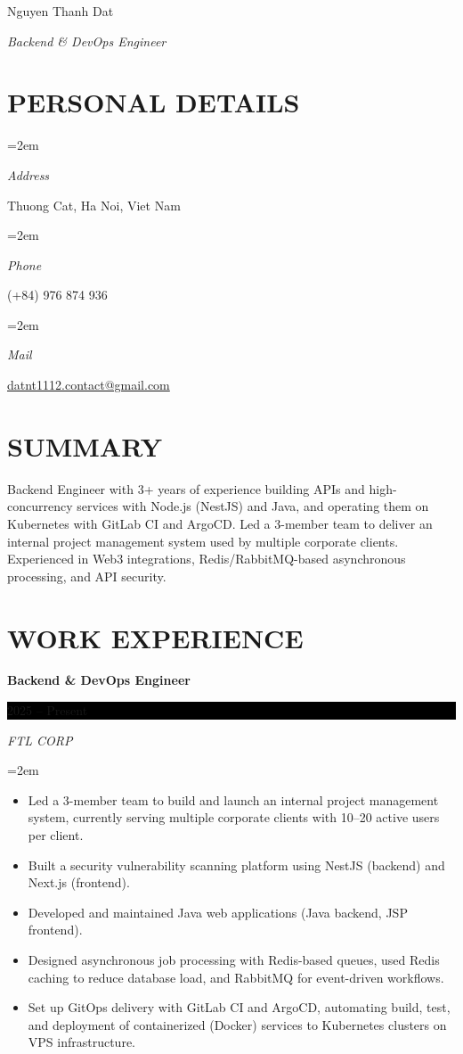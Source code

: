 \documentclass[paper=a4,fontsize=11pt]{scrartcl} %
\newlength{\spacebox}
\newcommand{\sepspace}{\vspace*{1em}}     %
\newcommand{\MyName}[1]{ %
		\Huge \usefont{T1}{phv}{b}{n} \hfill #1
		\par \normalsize \normalfont}
\newcommand{\MySlogan}[1]{ %
		\large \usefont{T1}{phv}{m}{n}\hfill \textit{#1}
		\par \normalsize \normalfont}
\newcommand{\NewPart}[1]{\section*{\uppercase{#1}}}
\newcommand{\PersonalEntry}[2]{
		\noindent\hangindent=2em\hangafter=0 %
		\parbox{\spacebox}{        %
		\textit{#1}}               %
		\hspace{1.5em} #2 \par}    %
\newcommand{\EducationEntry}[4]{
		\noindent \textbf{#1} \hfill      %
		\colorbox{Black}{%
			\parbox{7.5em}{%
			\hfill\color{White}#2}} \par  %
		\noindent \textit{#3} \par        %
		\noindent\hangindent=2em\hangafter=0 \small #4 %
		\normalsize \par}
\let\WorkExperienceEntry\EducationEntry  %
\begin{document}
\MyName{Nguyen Thanh Dat}
\MySlogan{Backend \& DevOps Engineer}

\sepspace

\NewPart{Personal details}{}

\PersonalEntry{Address}{Thuong Cat, Ha Noi, Viet Nam}
\PersonalEntry{Phone}{(+84) 976 874 936}
\PersonalEntry{Mail}{\url{datnt1112.contact@gmail.com}}

\NewPart{Summary}{}

\noindent Backend Engineer with 3+ years of experience building APIs and high-concurrency services with Node.js (NestJS) and Java, and operating them on Kubernetes with GitLab CI and ArgoCD. Led a 3-member team to deliver an internal project management system used by multiple corporate clients. Experienced in Web3 integrations, Redis/RabbitMQ-based asynchronous processing, and API security.

\NewPart{Work experience}{}

\WorkExperienceEntry{Backend \& DevOps Engineer}{2025 -- Present}{FTL CORP}{
\begin{itemize}\setlength{\itemsep}{1pt}\parskip0pt\parsep0pt
    \item Led a 3-member team to build and launch an internal project management system, currently serving multiple corporate clients with 10--20 active users per client.
    \item Built a security vulnerability scanning platform using NestJS (backend) and Next.js (frontend).
    \item Developed and maintained Java web applications (Java backend, JSP frontend).
    \item Designed asynchronous job processing with Redis-based queues, used Redis caching to reduce database load, and RabbitMQ for event-driven workflows.
    \item Set up GitOps delivery with GitLab CI and ArgoCD, automating build, test, and deployment of containerized (Docker) services to Kubernetes clusters on VPS infrastructure.
\end{itemize}
}

\sepspace
\end{document}
